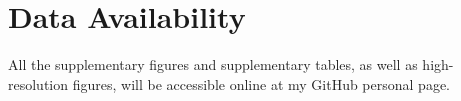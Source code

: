\documentclass[../main.tex]{subfiles}
\begin{document}
{
\chapter*{Data Availability}
\label{data_availability}
}

All the supplementary figures and supplementary tables, as well as high-resolution figures, will be accessible online at my GitHub personal page.
\end{document}
